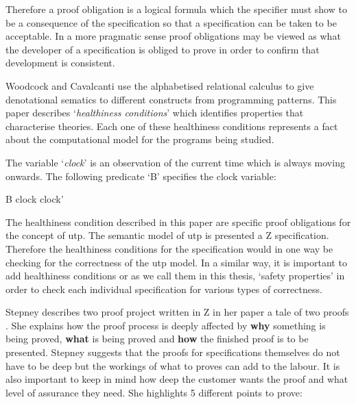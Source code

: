 Therefore a proof obligation is a logical formula which the specifier must show to be a consequence of the specification so that a specification can be taken to be acceptable. In a more pragmatic sense proof obligations may be viewed as what the developer of a specification is obliged to prove in order to confirm that development is consistent.

Woodcock and Cavalcanti \cite{woodcock2004tutorial} use the alphabetised relational calculus to give denotational sematics to different constructs from programming patterns. This paper describes `\emph{healthiness conditions}' which identifies properties that characterise theories. Each one of these healthiness conditions represents a fact about the computational model for the programs being studied.

\begin{exam}
The variable `\emph{clock}' is an observation of the current time which is always moving onwards. The following predicate `B' specifies the clock variable:

\begin{zed}
B  clock \leq clock'
\end{zed}
\end{exam}

The healthiness condition described in this paper are specific proof obligations for the concept of \gls{utp}. The semantic model of \gls{utp} is presented a Z specification. Therefore the healthiness conditions for the specification would in one way be checking for the correctness of the \gls{utp} model. In a similar way, it is important to add healthiness conditions or as we call them in this thesis, `safety properties' in order to check each individual specification for various types of correctness.

Stepney describes two proof project written in Z in her paper a tale of two proofs \cite{stepney1998tale}. She explains how the proof process is deeply affected by \textbf{why} something is being proved, \textbf{what} is being proved and \textbf{how} the finished proof is to be presented. Stepney suggests that the proofs for specifications themselves do not have to be deep but the workings of what to proves can add to the labour. It is also important to keep in mind how deep the customer wants the proof and what level of assurance they need. She highlights 5 different points to prove:

